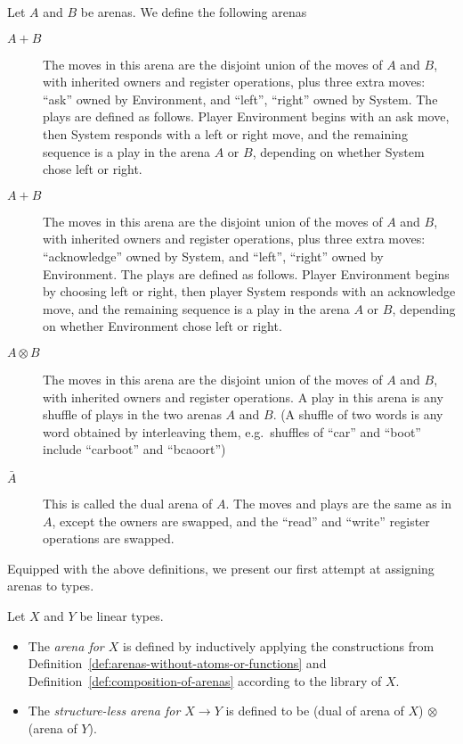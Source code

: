 \begin{definition}\label{def:composition-of-arenas}
    Let  $A$ and $B$ be arenas. We define the following arenas
        \begin{description}
            \item[$A+B$] The moves in this arena are the disjoint union of the moves of $A$ and $B$, with inherited owners and register operations, plus three extra moves: ``ask'' owned by Environment, and ``left'', ``right'' owned by System. 
            The plays are defined as follows. Player Environment begins with  an ask move, then System responds with a left or right move, and the remaining sequence is a play in the arena $A$ or $B$, depending on whether System chose left or right.
            \item[$A+B$] The moves in this arena are the disjoint union of the moves of $A$ and $B$, with inherited owners and register operations, plus three extra moves: ``acknowledge'' owned by System, and ``left'', ``right'' owned by Environment. 
            The plays are defined as follows. Player Environment begins by choosing left or right, then player System responds with an acknowledge move, and the remaining sequence is a play  in the arena $A$ or $B$, depending on whether Environment chose left or right.
            \item[$A \otimes B$] The moves in this arena are the disjoint union of the moves of $A$ and $B$, with inherited owners and register operations. A play in this arena is any shuffle of plays in the two arenas $A$ and $B$. (A shuffle of two words is any word obtained by interleaving them, e.g.~shuffles of ``car'' and ``boot'' include ``carboot'' and ``bcaoort'')
            \item[$\bar A$] This is called the dual arena of $A$. The moves and plays are the same as in $A$, except the owners are swapped, and the ``read'' and ``write'' register operations are swapped.
        \end{description} 
\end{definition}

Equipped with the above definitions, we  present our first attempt at assigning arenas to types. 

\begin{definition} Let $X$ and $Y$ be linear types.
    \begin{itemize}
        \item The \emph{arena for  $X$} is defined by inductively applying the constructions from Definition~\ref{def:arenas-without-atoms-or-functions} and Definition~\ref{def:composition-of-arenas} according to the library of $X$.
        \item The \emph{structure-less arena for $X \to Y$} is defined to be (dual of arena of $X$) $\otimes$ (arena of $Y$).
    \end{itemize}
\end{definition}

